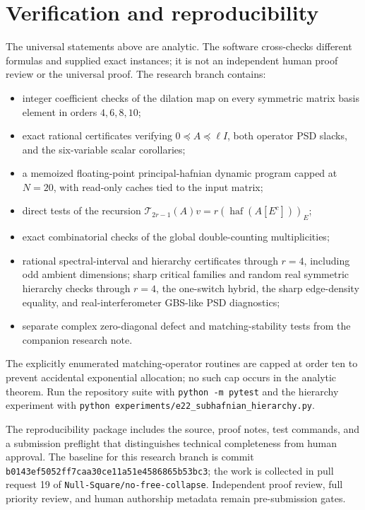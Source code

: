 \documentclass[11pt]{article}
\theoremstyle{remark}\newtheorem{remark}[theorem]{Remark}
\DeclareMathOperator{\haf}{haf}\DeclareMathOperator{\tr}{tr}
\begin{document}
\section{Verification and reproducibility}
The universal statements above are analytic.  The software cross-checks different formulas and supplied exact instances;
it is not an independent human proof review or the universal proof.  The research branch contains:
\begin{itemize}
\item integer coefficient checks of the dilation map on every symmetric matrix
basis element in orders $4,6,8,10$;
\item exact rational certificates verifying $0\preceq A\preceq\ell I$, both
operator PSD slacks, and the six-variable scalar corollaries;
\item a memoized floating-point principal-hafnian dynamic program capped at $N=20$,
with read-only caches tied to the input matrix;
\item direct tests of the recursion
$\mathcal T_{2r-1}(A)v=r(\haf(A[E^c]))_E$;
\item exact combinatorial checks of the global double-counting multiplicities;
\item rational spectral-interval and hierarchy certificates through $r=4$,
including odd ambient dimensions; sharp critical families and random real symmetric hierarchy
checks through $r=4$, the one-switch hybrid, the sharp edge-density equality,
and real-interferometer GBS-like PSD diagnostics;
\item separate complex zero-diagonal defect and matching-stability tests from
the companion research note.
\end{itemize}
The explicitly enumerated matching-operator routines are capped at order ten
to prevent accidental exponential allocation; no such cap occurs in the
analytic theorem.  Run the repository suite with \texttt{python -m pytest} and
the hierarchy experiment with
\texttt{python experiments/e22\_subhafnian\_hierarchy.py}.

The reproducibility package includes the source, proof notes, test commands,
and a submission preflight that distinguishes technical completeness from
human approval. The baseline for this research branch is commit
\texttt{b0143ef5052ff7caa30ce11a51e4586865b53bc3}; the work is collected in
pull request 19 of \texttt{Null-Square/no-free-collapse}.  Independent
proof review, full priority review, and human authorship metadata remain
pre-submission gates.
\end{document}
